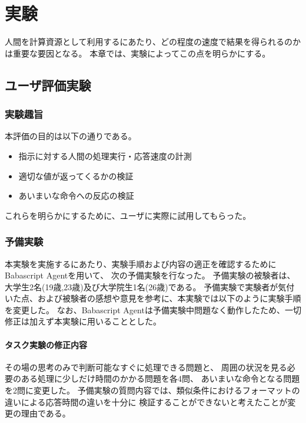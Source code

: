 \chapter{実験}\label{chap:evaluation}

人間を計算資源として利用するにあたり、どの程度の速度で結果を得られるのかは重要な要因となる。
本章では、実験によってこの点を明らかにする。

\newpage

\section{ユーザ評価実験}\label{sec:user-evaluation}

\subsection{実験趣旨}\label{ux5b9fux9a13ux8da3ux65e8}

本評価の目的は以下の通りである。

\begin{itemize}
\itemsep1pt\parskip0pt
\item
  指示に対する人間の処理実行・応答速度の計測
\item
  適切な値が返ってくるかの検証
\item
  あいまいな命令への反応の検証
\end{itemize}

これらを明らかにするために、ユーザに実際に試用してもらった。

\subsection{予備実験}\label{ux4e88ux5099ux5b9fux9a13}

本実験を実施するにあたり、実験手順および内容の適正を確認するためにBabascript
Agentを用いて、 次の予備実験を行なった。
予備実験の被験者は、大学生2名(19歳,23歳)及び大学院生1名(26歳)である。
予備実験で実験者が気付いた点、および被験者の感想や意見を参考に、本実験では以下のように実験手順を変更した。
なお、Babascript
Agentは予備実験中問題なく動作したため、一切修正は加えず本実験に用いることとした。

\subsubsection{タスク実験の修正内容}\label{ux30bfux30b9ux30afux5b9fux9a13ux306eux4feeux6b63ux5185ux5bb9}

その場の思考のみで判断可能なすぐに処理できる問題と、
周囲の状況を見る必要のある処理に少しだけ時間のかかる問題を各4問、
あいまいな命令となる問題を2問に変更した。
予備実験の質問内容では、類似条件におけるフォーマットの違いによる応答時間の違いを十分に
検証することができないと考えたことが変更の理由である。

